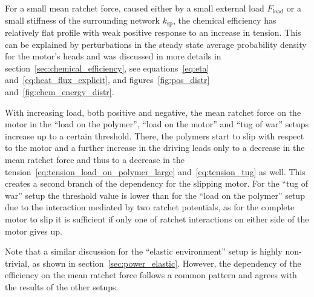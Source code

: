 \documentclass[aps,pre,twocolumn,showpacs,showkeys,superscriptaddress,floatfix]{revtex4-1}
\begin{document}
For a small mean ratchet force, caused either by a small external load $F_\text{load}$ or a small stiffness of the surrounding network $k_\text{sp}$, 
the chemical efficiency has relatively flat profile with weak positive response to an increase in tension.
This can be explained by perturbations in the steady state average probability density for the motor's heads 
and was discussed in more details in  section~\ref{sec:chemical_efficiency}, 
see equations~\eqref{eq:eta} and~\eqref{eq:heat_flux_explicit}, and figures~\ref{fig:pos_distr} and~\ref{fig:chem_energy_distr}.  

With increasing load, both positive and negative, the mean ratchet force on the motor in the ``load on the polymer'', ``load on the motor'' and ``tug of war'' setups increase up to a certain threshold.
There, the polymers start to slip with respect to the motor and a further increase in the driving leads only to a decrease in the mean ratchet force and thus to a decrease in the tension~\eqref{eq:tension_load_on_polymer_large} and~\eqref{eq:tension_tug} as well.
This creates a second branch of the dependency for the slipping motor. 
For the ``tug of war'' setup the threshold value is lower than for the ``load on the polymer'' setup due to the interaction mediated by two ratchet potentials, 
as for the complete motor to slip it is sufficient if only one of ratchet interactions on either side of the motor gives up. 

Note that a similar discussion for the ``elastic environment'' setup is highly non-trivial, as shown in section~\ref{sec:power_elastic}.
However, the dependency of the efficiency on the mean ratchet force follows a common pattern and agrees with the results of the other setups. 
\end{document}
